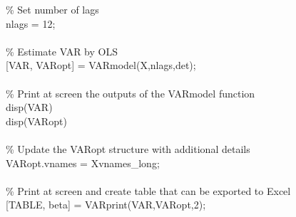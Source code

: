\hspace{1mm}\hspace{5mm} \hspace{5mm} \textcolor{matlabgreen}{\% Set number of lags }\\ 
\hspace{1mm}\hspace{5mm} \hspace{5mm} nlags = 12; \\ 
\hspace{1mm}\hspace{5mm} \hspace{5mm}  \\ 
\hspace{1mm}\hspace{5mm} \hspace{5mm} \textcolor{matlabgreen}{\% Estimate VAR by OLS }\\ 
\hspace{1mm}\hspace{5mm} \hspace{5mm} [VAR, VARopt] = VARmodel(X,nlags,det); \\ 
\hspace{1mm}\hspace{5mm} \hspace{5mm}  \\ 
\hspace{1mm}\hspace{5mm} \hspace{5mm} \textcolor{matlabgreen}{\% Print at screen the outputs of the VARmodel \textcolor{matlabblue}{function} }\\ 
\hspace{1mm}disp(VAR) \\ 
\hspace{1mm}disp(VARopt) \\ 
\hspace{1mm} \\ 
\hspace{1mm}\textcolor{matlabgreen}{\% Update the VARopt structure with additional details }\\ 
\hspace{1mm}VARopt.vnames = Xvnames\_long; \\ 
\hspace{1mm} \\ 
\hspace{1mm}\textcolor{matlabgreen}{\% Print at screen and create table that can be exported to Excel }\\ 
\hspace{1mm}[TABLE, beta] = VARprint(VAR,VARopt,2); \\ 
